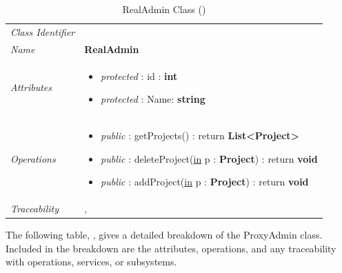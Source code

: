 \documentclass[12pt,letterpaper]{article}
\begin{document}
\begin{table}[H]
    \caption{RealAdmin Class ()} 
	\begin{tabu} to 
		\toprule
		Class Identifier &  \\
		Name & {\bf RealAdmin} \\
		Attributes & 
		\begin{minipage}[t]{\linewidth}
		    \begin{itemize}
		        \item \textit{protected} : id : {\bf int}
		        \item \textit{protected} : Name: {\bf string}
			\end{itemize}
	    \end{minipage} \\

		Operations &
		\begin{minipage}[t]{\linewidth}
			\begin{itemize}
			    \item {\it public} : getProjects() : return {\bf List<Project>}
			    \item {\it public} : deleteProject(\underline{in} p : {\bf Project}) : return {\bf void}
			    \item {\it public} : addProject(\underline{in} p : {\bf Project}) : return {\bf void}
	        \end{itemize}
	    \end{minipage} \\
	    	Traceability & , \\
		\toprule
	\end{tabu}
\end{table}

The following table, , gives a detailed breakdown of the ProxyAdmin class. Included in the breakdown are the attributes, operations, and any traceability with operations, services, or subsystems.
\end{document}
